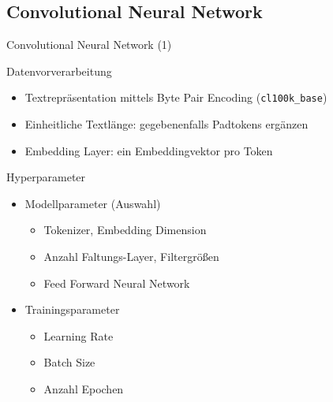 \documentclass[aspectratio=169]{beamer} %
\begin{document}
\subsection{Convolutional Neural Network}

\begin{frame}{Convolutional Neural Network (1)}
    \begin{block}{Datenvorverarbeitung}
        \begin{itemize}
            \item Textrepr\"asentation mittels Byte Pair Encoding (\texttt{cl100k\_base})

            \item Einheitliche Textl\"ange: gegebenenfalls Padtokens erg\"anzen

            \item Embedding Layer: ein Embeddingvektor pro Token
        \end{itemize}
    \end{block}

    \pause

    \begin{block}{Hyperparameter}
        \begin{itemize}
            \item Modellparameter (Auswahl)
            \begin{itemize}
                \item Tokenizer, Embedding Dimension

                \item Anzahl Faltungs-Layer, Filtergr\"o{\ss}en

                \item Feed Forward Neural Network
            \end{itemize}

            \item Trainingsparameter
            \begin{itemize}
                \item Learning Rate

                \item Batch Size

                \item Anzahl Epochen
            \end{itemize}
        \end{itemize}
    \end{block}
\end{frame}
\end{document}
